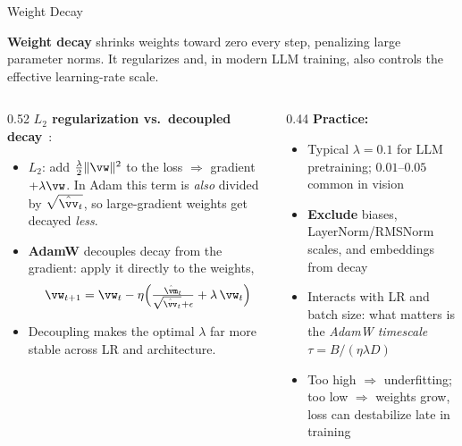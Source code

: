 \begin{frame}{Weight Decay}

  \textbf{Weight decay} shrinks weights toward zero every step, penalizing large parameter norms. It regularizes and, in modern LLM training, also controls the effective learning-rate scale.

  \vspace{0.3em}
  \begin{columns}[T]
    \begin{column}{0.52\textwidth}
      \textbf{$L_2$ regularization vs.\ decoupled decay}~\cite{loshchilov2019adamw}:
      \begin{itemize}
        \item $L_2$: add $\tfrac{\lambda}{2}\|\vw\|^2$ to the loss $\Rightarrow$ gradient $+\lambda\vw$. In Adam this term is \emph{also} divided by $\sqrt{\hat{\vv}_t}$, so large-gradient weights get decayed \emph{less}.
        \item \textbf{AdamW} decouples decay from the gradient: apply it directly to the weights,
        \[
          \vw_{t+1} = \vw_t - \eta\Big(\tfrac{\hat{\vm}_t}{\sqrt{\hat{\vv}_t}+\epsilon} + \lambda\,\vw_t\Big)
        \]
        \item Decoupling makes the optimal $\lambda$ far more stable across LR and architecture.
      \end{itemize}
    \end{column}
    \begin{column}{0.44\textwidth}
      \textbf{Practice:}
      \begin{itemize}
        \item Typical $\lambda = 0.1$ for LLM pretraining; $0.01$--$0.05$ common in vision
        \item \textbf{Exclude} biases, LayerNorm/RMSNorm scales, and embeddings from decay
        \item Interacts with LR and batch size: what matters is the \emph{AdamW timescale} $\tau = B/(\eta\lambda D)$~\cite{bernstein2025powerlines}
        \item Too high $\Rightarrow$ underfitting; too low $\Rightarrow$ weights grow, loss can destabilize late in training
      \end{itemize}
    \end{column}
  \end{columns}
\end{frame}

